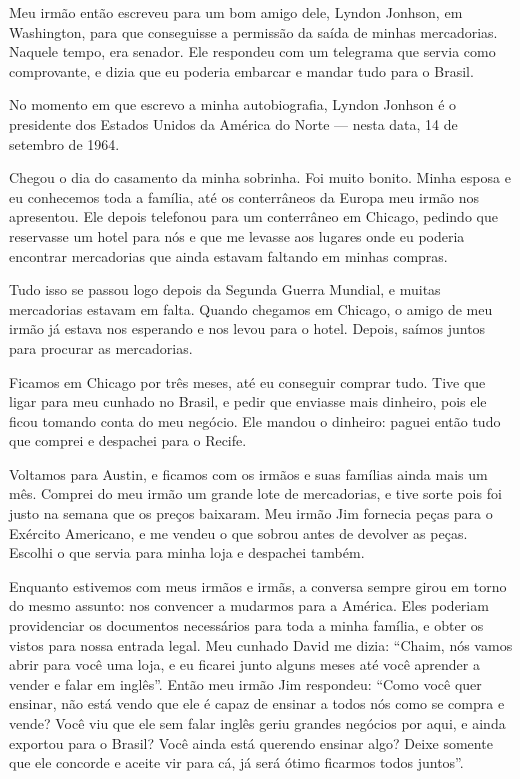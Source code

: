 Meu irmão então escreveu para um bom amigo dele, Lyndon Jonhson,
em Washington, para que conseguisse a
permissão da saída de minhas mercadorias. Naquele tempo, era senador. Ele
respondeu com um telegrama que servia como comprovante, e dizia que eu poderia
embarcar e mandar tudo para o Brasil.

No momento em que escrevo a minha autobiografia, Lyndon
Jonhson é o presidente dos Estados Unidos da América do Norte --- nesta
data, 14 de setembro de 1964.

Chegou o dia do casamento da minha sobrinha. Foi muito bonito. Minha
esposa e eu conhecemos toda a família, até os conterrâneos da Europa
meu irmão nos apresentou. Ele depois telefonou para um conterrâneo
em Chicago, pedindo que reservasse um hotel para nós e que me levasse
aos lugares onde eu poderia encontrar mercadorias que ainda estavam
faltando em minhas compras. 

Tudo isso se passou logo depois da Segunda Guerra Mundial, e muitas mercadorias estavam em falta. Quando chegamos em Chicago, o amigo de meu irmão já estava nos esperando e nos
levou para o hotel. Depois, saímos juntos para procurar as mercadorias.

Ficamos em Chicago por três meses, até eu conseguir comprar tudo. Tive que
ligar para meu cunhado no Brasil, e pedir que enviasse mais dinheiro, pois ele ficou tomando conta do meu negócio. Ele mandou o dinheiro: 
paguei então tudo que comprei e despachei para o Recife.

Voltamos para Austin, e ficamos com os irmãos e suas famílias ainda mais
um mês. Comprei do meu irmão um grande lote de mercadorias, e tive
sorte pois foi justo na semana que os preços baixaram. Meu irmão Jim
fornecia peças para o Exército Americano, e me vendeu o que sobrou
antes de devolver as peças. Escolhi o que servia para minha loja e
despachei também.

Enquanto estivemos com meus irmãos e irmãs, a conversa sempre
girou em torno do mesmo assunto: nos convencer a mudarmos para a
América. Eles poderiam providenciar os documentos necessários para toda a 
minha família, e obter os vistos para nossa entrada legal. Meu cunhado
David me dizia: ``Chaim, nós vamos abrir para você uma loja, e eu ficarei
junto alguns meses até você aprender a vender e falar em inglês''. Então
meu irmão Jim respondeu: ``Como você quer ensinar, não está vendo que
ele é capaz de ensinar a todos nós como se compra e vende? Você viu que
ele sem falar inglês geriu grandes negócios por aqui, e ainda
exportou para o Brasil? Você ainda está querendo ensinar algo?
Deixe somente que ele concorde e aceite vir para cá, já será ótimo
ficarmos todos juntos''.

